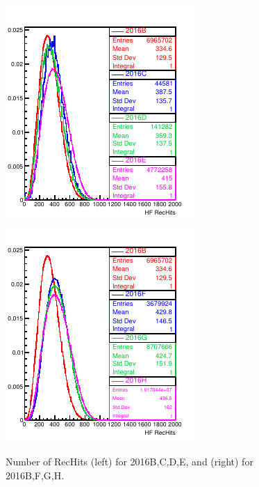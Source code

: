 \begin{figure}[!h] %
\centering
\includegraphics[width=0.45\linewidth]{../Figures/Chap2/ImageFiles_HF/BasicPics/Comp2016/nRecHits2016BtoE.pdf}
\includegraphics[width=0.45\linewidth]{../Figures/Chap2/ImageFiles_HF/BasicPics/Comp2016/nRecHits2016BFGH.pdf}
\caption{Number of RecHits (left) for 2016B,C,D,E, and (right) for 2016B,F,G,H.}
\label{nRecHits2016BtoH}
\end{figure}

